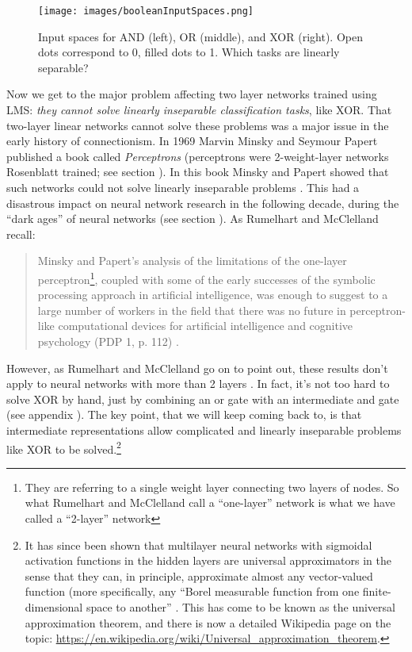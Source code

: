 \begin{figure}[h]
\centering
\texttt{[image: images/booleanInputSpaces.png]}
\caption[Jeff Yoshimi.]{Input spaces for AND (left), OR (middle), and XOR (right). Open dots correspond to 0, filled dots to 1. Which tasks are linearly separable?}
\label{boolean_inputspace}
\end{figure}

Now we get to the major problem affecting two layer networks trained using LMS: \emph{they cannot solve linearly inseparable classification tasks}, like XOR. That two-layer linear networks cannot solve these problems was a major issue in the early history of connectionism. In 1969 Marvin Minsky and Seymour Papert published a book called {\em Perceptrons} (perceptrons were 2-weight-layer networks Rosenblatt trained; see section ). In this book Minsky and Papert showed that such networks could not solve linearly inseparable problems \cite{minsky1969perceptrons}. This had a disastrous impact on neural network research in the following decade, during the ``dark ages'' of neural networks (see section ). As Rumelhart and McClelland recall:

\begin{quote}
Minsky and Papert's analysis of the limitations of the one-layer perceptron\footnote{They are referring to a single weight layer connecting two layers of nodes. So what Rumelhart and McClelland call a ``one-layer'' network is what we have called a ``2-layer'' network}, coupled with some of the early successes of the symbolic processing approach in artificial intelligence, was enough to suggest to a large number of workers in the field that there was no future in perceptron-like computational devices for artificial intelligence and cognitive psychology (PDP 1, p. 112) \cite{rumelhart1986parallel}.
\end{quote}

However, as Rumelhart and McClelland go on to point out, these results don't apply to neural networks with more than 2 layers \cite{rumelhart1986parallel}. In fact, it's not too hard to solve XOR by hand, just by combining an or gate with an intermediate and gate (see appendix ). The key point, that we will keep coming back to, is that intermediate representations allow complicated and linearly inseparable problems like XOR to be solved.\footnote{It has since been shown that multilayer neural networks with sigmoidal activation functions in the hidden layers are universal approximators in the sense that they can, in principle, approximate almost any vector-valued function (more specifically, any ``Borel measurable function from one finite-dimensional space to another'' \cite{hornik1989multilayer}. This has come to be known as the universal approximation theorem, and there is now a detailed Wikipedia page on the topic: \url{https://en.wikipedia.org/wiki/Universal_approximation_theorem}.}

